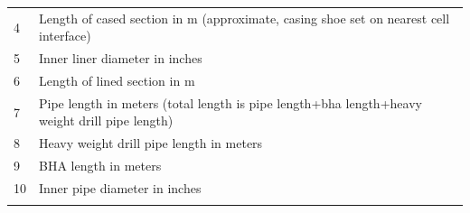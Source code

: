 \begin{longtable}[]{@{}ll@{}}
\begin{minipage}[t]{0.06\columnwidth}\raggedright
4\strut
\end{minipage} & \begin{minipage}[t]{0.89\columnwidth}\raggedright
Length of cased section in m (approximate, casing shoe set on nearest
cell interface)\strut
\end{minipage}\tabularnewline
\begin{minipage}[t]{0.06\columnwidth}\raggedright
5\strut
\end{minipage} & \begin{minipage}[t]{0.89\columnwidth}\raggedright
Inner liner diameter in inches\strut
\end{minipage}\tabularnewline
\begin{minipage}[t]{0.06\columnwidth}\raggedright
6\strut
\end{minipage} & \begin{minipage}[t]{0.89\columnwidth}\raggedright
Length of lined section in m\strut
\end{minipage}\tabularnewline
\begin{minipage}[t]{0.06\columnwidth}\raggedright
7\strut
\end{minipage} & \begin{minipage}[t]{0.89\columnwidth}\raggedright
Pipe length in meters (total length is pipe length+bha length+heavy
weight drill pipe length)\strut
\end{minipage}\tabularnewline
\begin{minipage}[t]{0.06\columnwidth}\raggedright
8\strut
\end{minipage} & \begin{minipage}[t]{0.89\columnwidth}\raggedright
Heavy weight drill pipe length in meters\strut
\end{minipage}\tabularnewline
\begin{minipage}[t]{0.06\columnwidth}\raggedright
9\strut
\end{minipage} & \begin{minipage}[t]{0.89\columnwidth}\raggedright
BHA length in meters\strut
\end{minipage}\tabularnewline
\begin{minipage}[t]{0.06\columnwidth}\raggedright
10\strut
\end{minipage} & \begin{minipage}[t]{0.89\columnwidth}\raggedright
Inner pipe diameter in inches\strut
\end{minipage}\tabularnewline
\begin{minipage}[t]{0.06\columnwidth}\raggedright

\end{minipage}
\end{longtable}
